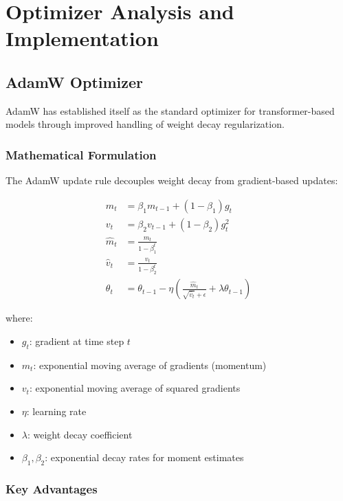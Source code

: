 
\section{Optimizer Analysis and Implementation}

\subsection{AdamW Optimizer}

AdamW \cite{loshchilov2019decoupled} has established itself as the standard optimizer for transformer-based models through improved handling of weight decay regularization.

\subsubsection{Mathematical Formulation}

The AdamW update rule decouples weight decay from gradient-based updates:

\begin{align}
m_t &= \beta_1 m_{t-1} + (1 - \beta_1) g_t \\
v_t &= \beta_2 v_{t-1} + (1 - \beta_2) g_t^2 \\
\hat{m}_t &= \frac{m_t}{1 - \beta_1^t} \\
\hat{v}_t &= \frac{v_t}{1 - \beta_2^t} \\
\theta_t &= \theta_{t-1} - \eta \left( \frac{\hat{m}_t}{\sqrt{\hat{v}_t} + \epsilon} + \lambda \theta_{t-1} \right)
\end{align}

where:
\begin{itemize}
    \item $g_t$: gradient at time step $t$
    \item $m_t$: exponential moving average of gradients (momentum)
    \item $v_t$: exponential moving average of squared gradients
    \item $\eta$: learning rate
    \item $\lambda$: weight decay coefficient
    \item $\beta_1, \beta_2$: exponential decay rates for moment estimates
\end{itemize}

\subsubsection{Key Advantages}

